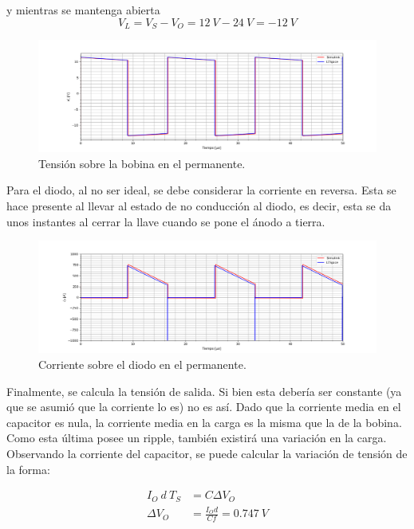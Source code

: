y mientras se mantenga abierta
\begin{equation*}
	V_L = V_S - V_O = 12 \ V - 24 \ V = -12 \ V
\end{equation*}

\begin{figure}[H]
	\centering
	\includegraphics[width=\linewidth]{ImagenesEjercicio-2/vl.png}
	\caption{Tensión sobre la bobina en el permanente.}
	\label{fig:ej2:vl}
\end{figure}

Para el diodo, al no ser ideal, se debe considerar la corriente en reversa. Esta se hace presente al llevar al estado de no conducción al diodo, es decir, esta se da unos instantes al cerrar la llave cuando se pone el ánodo a tierra.

\begin{figure}[H]
	\centering
	\includegraphics[width=\linewidth]{ImagenesEjercicio-2/id.png}
	\caption{Corriente sobre el diodo en el permanente.}
	\label{fig:ej2:id}
\end{figure}

Finalmente, se calcula la tensión de salida. Si bien esta debería ser constante (ya que se asumió que la corriente lo es) no es así. Dado que la corriente media en el capacitor es nula, la corriente media en la carga es la misma que la de la bobina. Como esta última posee un ripple, también existirá una variación en la carga. Observando la corriente del capacitor, se puede calcular la variación de tensión de la forma:

\begin{align*}
I_O \ d \ T_S &= C \Delta V_O	\\
\Delta V_O &= \frac{I_O d}{C f} = 0.747 \ V
\end{align*}

